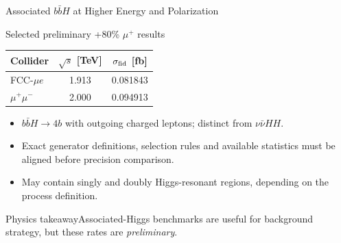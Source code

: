 \documentclass[aspectratio=1610,english]{beamer}
\newcommand{\src}[1]{\vfill{\par\color{black!65}\fontsize{6.4}{7.4}\selectfont\emph{Source:} #1\par}}
\newcommand{\key}[1]{\begin{alertblock}{Physics takeaway}\small  #1\end{alertblock}}
\begin{document}
\begin{frame}[t]{Associated $b\bar bH$ at Higher Energy and Polarization}
\small

\begin{block}{Selected preliminary +80\% $\mu^+$ results}
\begin{center}\begin{tabular}{lcc}\toprule
Collider & $\sqrt{s}$ [TeV] & $\sigma_{\rm fid}$ [fb]\\\midrule
FCC-$\mu e$ & 1.913 & 0.081843\\
$\mu^+\mu^-$ & 2.000 & 0.094913\\\bottomrule
\end{tabular}\end{center}
\end{block}

\begin{itemize}
\justifying 
\item $b\bar bH\to4b$ with outgoing charged leptons; distinct from $\nu\bar\nu HH$.
\item Exact generator definitions, selection rules and available statistics must be aligned before precision comparison.
\item May contain singly and doubly Higgs-resonant regions, depending on the process definition.
\end{itemize}

\key{\justifying Associated-Higgs benchmarks are useful for background strategy, but these rates are \emph{preliminary}.}

\end{frame}
\end{document}
